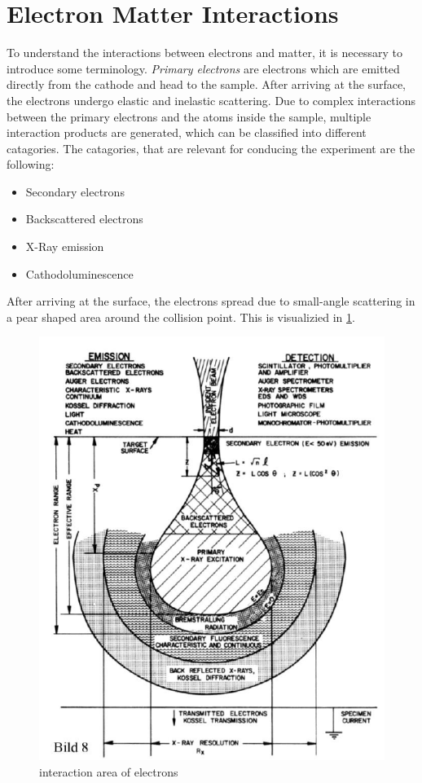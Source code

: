 \section{Electron Matter Interactions}
To understand the interactions between electrons and matter, it is 
necessary to introduce some terminology.
\textit{Primary electrons} are electrons which are emitted directly from
the cathode and head to the sample.
After arriving at the surface, the electrons undergo elastic and inelastic scattering.
Due to complex interactions between the primary electrons and the atoms 
inside the sample, multiple interaction products are generated, which can
be classified into different catagories. 
The catagories, that are relevant for conducing the experiment are the 
following:
\begin{itemize}
	\item Secondary electrons
	\item Backscattered electrons
	\item X-Ray emission
	\item Cathodoluminescence
\end{itemize}
After arriving at the surface, the electrons spread due to 
small-angle scattering in a pear shaped area around the collision point. 
This is visualizied in \cref{fig:birne}.
\begin{figure}[H] 
	\centering
	\includegraphics[width=0.95\linewidth]{../assets/birne.png}
	\caption{interaction area of electrons}
	\label{fig:birne}
\end{figure}


